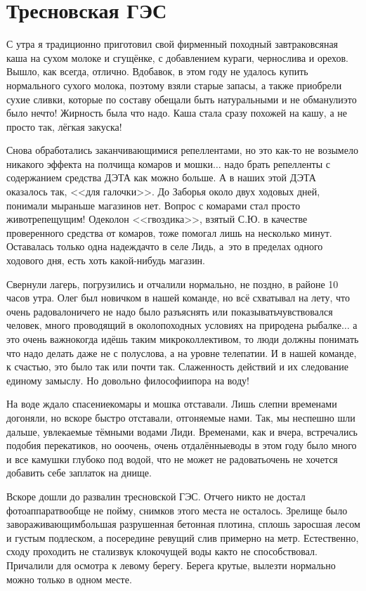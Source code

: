 \chapter{Тресновская ГЭС} 

С утра я традиционно приготовил свой фирменный походный завтрак\mdash овсяная каша на сухом молоке и сгущёнке, с добавлением кураги, чернослива и орехов. Вышло, как всегда, отлично. Вдобавок, в этом году не удалось купить нормального сухого молока, поэтому взяли старые запасы, а также приобрели сухие сливки, которые по составу обещали быть натуральными и не обманули\mdash это было нечто! Жирность была что надо. Каша стала сразу похожей на кашу, а не просто так, лёгкая закуска! 

Снова обработались заканчивающимися репеллентами, но это как-то не возымело никакого эффекта на полчища комаров и мошки$\ldots$ надо брать репелленты с содержанием средства ДЭТА как можно больше. А в наших этой ДЭТА оказалось так, <<для галочки>>. До Заборья около двух ходовых дней, понимали мы\mdash раньше магазинов нет. Вопрос с комарами стал просто животрепещущим! Одеколон <<гвоздика>>, взятый С.Ю. в качестве проверенного средства от комаров, тоже помогал лишь на несколько минут. Оставалась только одна надежда\mdash что в селе Лидь, а~это в пределах одного ходового дня, есть хоть какой-нибудь магазин.

Свернули лагерь, погрузились и отчалили нормально, не поздно, в районе 10 часов утра. Олег был новичком в нашей команде, но всё схватывал на лету, что очень радовало\mdash ничего не надо было разъяснять или показывать\mdash чувствовался человек, много проводящий в околопоходных условиях на природе\mdash на рыбалке$\ldots$ а это очень важно\mdash когда идёшь таким микроколлективом, то люди должны понимать что надо делать даже не с полуслова, а на уровне телепатии. И в нашей команде, к счастью, это было так или почти так. Слаженность действий и их следование единому замыслу. Но довольно философии\mdash пора на воду!

На воде ждало спасение\mdash комары и мошка отставали. Лишь слепни временами догоняли, но вскоре быстро отставали, отгоняемые нами. Так, мы неспешно шли дальше, увлекаемые тёмными водами Лиди. Временами, как и вчера, встречались подобия перекатиков, но о\sdash о\sdash очень, очень отдалённые\mdash воды в этом году было много и все камушки глубоко под водой, что не может не радовать\mdash очень не хочется добавить себе заплаток на днище. 

Вскоре дошли до развалин тресновской ГЭС. Отчего никто не достал фотоаппарат\mdash вообще не пойму, снимков этого места не осталось. Зрелище было завораживающим\mdash большая разрушенная бетонная плотина, сплошь заросшая лесом и густым подлеском, а посередине ревущий слив примерно на метр. Естественно, сходу проходить не стали\mdash звук клокочущей воды как\sdash то не способствовал. Причалили для осмотра к левому берегу. Берега крутые, вылезти нормально можно только в одном месте. 

